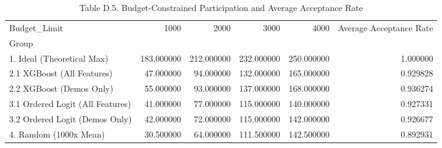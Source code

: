 \begin{table}
\caption{Table D.5. Budget-Constrained Participation and Average Acceptance Rate}
\begin{tabular}{lrrrrr}
\toprule
Budget_Limit & 1000 & 2000 & 3000 & 4000 & Average Acceptance Rate \\
Group &  &  &  &  &  \\
\midrule
1. Ideal (Theoretical Max) & 183.000000 & 212.000000 & 232.000000 & 250.000000 & 1.000000 \\
2.1 XGBoost (All Features) & 47.000000 & 94.000000 & 132.000000 & 165.000000 & 0.929828 \\
2.2 XGBoost (Demos Only) & 55.000000 & 93.000000 & 137.000000 & 168.000000 & 0.936274 \\
3.1 Ordered Logit (All Features) & 41.000000 & 77.000000 & 115.000000 & 140.000000 & 0.927331 \\
3.2 Ordered Logit (Demos Only) & 42.000000 & 72.000000 & 115.000000 & 142.000000 & 0.926677 \\
4. Random (1000x Mean) & 30.500000 & 64.000000 & 111.500000 & 142.500000 & 0.892931 \\
\bottomrule
\end{tabular}
\end{table}
